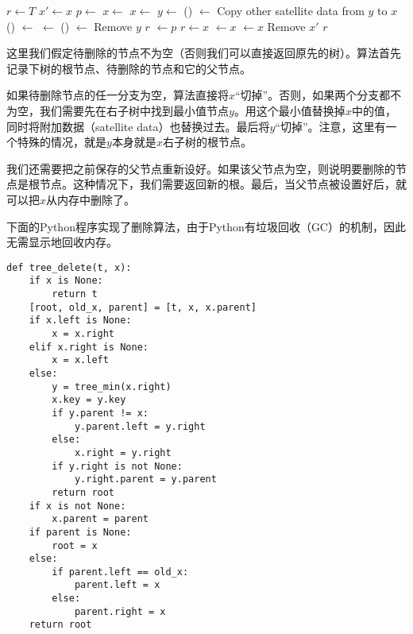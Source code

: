 \documentclass[b5paper]{ctexart}
\begin{document}
\begin{algorithmic}[1]
  \State $r \gets T$
  \State $x' \gets x$ 
  \State $p \gets $ 
    \State $x \gets $ 
    \State $x \gets $ 
  \Else
    \State  $y \gets $ ()
    \State {} $\gets$ 
    \State Copy other satellite data from $y$ to $x$
      \State {}() $\gets$ 
    \Else
      \State {} $\gets$ 
    \EndIf
      \State {}() $\gets$ 
    \EndIf
    \State Remove $y$
    \State \Return $r$
  \EndIf
    \State {} $\gets p$
  \EndIf
    \State $r \gets x$
  \Else
      \State {} $\gets x$
    \Else
      \State {} $\gets x$
    \EndIf
  \EndIf
  \State Remove $x'$
  \State \Return $r$
\EndFunction
\end{algorithmic}

这里我们假定待删除的节点不为空（否则我们可以直接返回原先的树）。算法首先记录下树的根节点、待删除的节点和它的父节点。

如果待删除节点的任一分支为空，算法直接将$x$“切掉”。否则，如果两个分支都不为空，我们需要先在右子树中找到最小值节点$y$。用这个最小值替换掉$x$中的值，同时将附加数据（satellite data）也替换过去。最后将$y$“切掉”。注意，这里有一个特殊的情况，就是$y$本身就是$x$右子树的根节点。

我们还需要把之前保存的父节点重新设好。如果该父节点为空，则说明要删除的节点是根节点。这种情况下，我们需要返回新的根。最后，当父节点被设置好后，就可以把$x$从内存中删除了。

下面的Python程序实现了删除算法，由于Python有垃圾回收（GC）的机制，因此无需显示地回收内存。

\lstset{language=Python}
\begin{lstlisting}
def tree_delete(t, x):
    if x is None:
        return t
    [root, old_x, parent] = [t, x, x.parent]
    if x.left is None:
        x = x.right
    elif x.right is None:
        x = x.left
    else:
        y = tree_min(x.right)
        x.key = y.key
        if y.parent != x:
            y.parent.left = y.right
        else:
            x.right = y.right
        if y.right is not None:
            y.right.parent = y.parent
        return root
    if x is not None:
        x.parent = parent
    if parent is None:
        root = x
    else:
        if parent.left == old_x:
            parent.left = x
        else:
            parent.right = x
    return root
\end{lstlisting}
\end{document}
